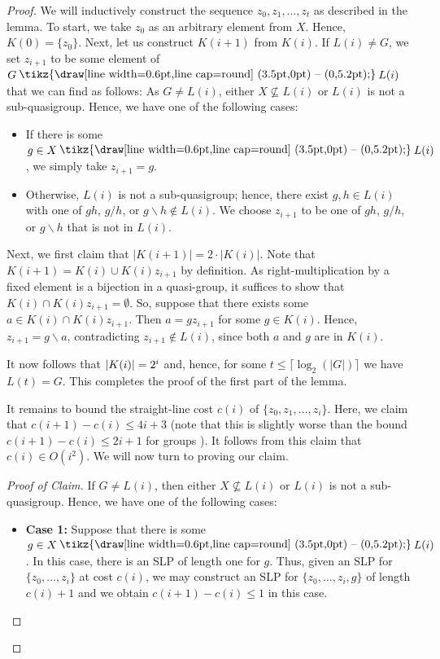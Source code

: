 \documentclass{theoretics}
\newcommand{\abs}[1]{\left|\mathinner{#1}\right|}
\renewcommand{\setminus}{\mysetminus}
\newcommand{\mysetminusD}{\raisebox{.8pt}{\hbox{\tikz{\draw[line width=0.6pt,line cap=round] (3.5pt,0pt) -- (0,5.2pt);}}}}
\newcommand{\mysetminusT}{\mysetminusD}
\newcommand{\mysetminusS}{\raisebox{.5pt}{\hbox{\tikz{\draw[line width=0.45pt,line cap=round] (2.2pt,0) -- (0,3.8pt);}}}}
\newcommand{\mysetminusSS}{\raisebox{.35pt}{\hbox{\tikz{\draw[line width=0.4pt,line cap=round] (1.5pt,0) -- (0,2.8pt);}}}}
\newcommand{\mysetminus}{\mathbin{\mathchoice{\mysetminusD}{\mysetminusT}{\mysetminusS}{\mysetminusSS}}}
\begin{document}
\begin{proof}
 We will inductively construct the sequence $z_0,z_{1}, \ldots, z_{t}$ as described in the lemma. To start, we take $z_0$ as an arbitrary element from $X$. Hence,  $K(0) = \{z_0\}$. 
Next, let us construct $K(i+1)$ from $K(i)$. If $L(i) \neq G$, we set $z_{i+1}$ to be some  element of $G \setminus L(i)$ that we can find as follows:
As $G \neq L(i)$, either $X \not\subseteq L(i)$ or $L(i)$ is not a sub-quasigroup. Hence, we have one of the following cases:
\begin{itemize}
    \item  If there is some $g \in X \setminus L(i)$, we simply take $z_{i+1} = g$.


    \item Otherwise, $L(i)$ is not a sub-quasigroup; hence, there exist $g,h \in L(i)$ with one of $gh$, $g/h$, or $g\backslash h \not \in L(i)$. We choose $z_{i+1}$ to be one of $gh$, $g/h$, or $g\backslash h$ that is not in $L(i)$.
    
\end{itemize} 



Next, we first claim that $|K(i+1)| = 2 \cdot |K(i)|$.
Note that $K(i+1)= K(i) \cup K(i)z_{i+1}$ by definition.
As right-multiplication by a fixed element is a bijection in a quasi-group, it suffices to show that $K(i) \cap K(i)z_{i+1} = \emptyset$.
So, suppose that there exists some $a \in K(i) \cap K(i)z_{i+1}$. Then $a = gz_{i+1}$ for some $g \in K(i)$. Hence, $z_{i+1} = g\backslash a$, contradicting $z_{i+1} \not\in L(i)$, since both $a$ and $g$ are in $K(i)$. 

It now follows that $\abs{K(i)} = 2^i$ and, hence, for some $t \leq \lceil \log_{2}(|G|) \rceil$ we have $L(t) = G$. This completes the proof of the first part of the lemma.


\iffalse

It remains to bound the straight-line cost $c(i)$ of $\{z_0, z_{1}, \ldots, z_{i}\}$. Here, we claim that $c(i+1) - c(i) \leq 4i+3$ (note that this is slightly worse than the bound $c(i+1) - c(i) \leq 2i+1$ for groups \cite{BabaiSzemeredi}). It follows from this claim that $c(i) \in O(i^2)$. We will now turn to proving our claim.

\begin{proof}[Proof of Claim]
If $G \neq L(i)$, then either $X \not\subseteq L(i)$ or $L(i)$ is not a sub-quasigroup. Hence, we have one of the following cases:
\begin{itemize}
    \item \textbf{Case 1:} Suppose that there is some $g \in X \setminus L(i)$. In this case, there is an SLP of length one for $g$.
    Thus, given an SLP for $\{ z_0, \ldots, z_i\}$ at cost $c(i)$, we may construct an SLP for $\{ z_0, \ldots, z_i,g\}$ of length $c(i) + 1$ and we obtain $c(i+1) - c(i) \leq 1$ in this case.



\end{itemize}
\end{proof}
\end{proof}
\end{document}
